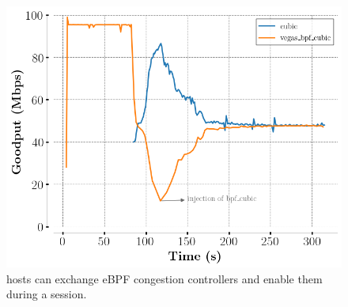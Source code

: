 \begin{figure}[!t]
  \begin{center}
    \includegraphics[width=.8\columnwidth]{pretty_plotify/plots/vegas_cubic.png}
  \end{center}
\vspace{-0.5cm}
  \caption{\tcpls hosts can exchange eBPF congestion controllers and enable 
  them during a \tcpls session.}
  \label{fig:vegasCubic}
\end{figure}

